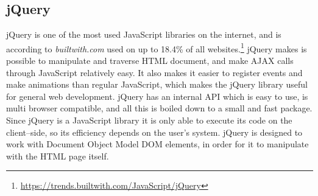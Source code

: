 \subsection{jQuery} \label{ssec:jquery}
jQuery is one of the most used JavaScript libraries on the internet, and is according to \textit{builtwith.com} used on up to 18.4\% of all websites.\footnote{\url{https://trends.builtwith.com/JavaScript/jQuery}}
jQuery makes is possible to manipulate and traverse HTML document, and make \ac{AJAX} calls through JavaScript relatively easy.
It also makes it easier to register events and make animations than regular JavaScript, which makes the jQuery library useful for general web development.
jQuery has an internal API which is easy to use, is multi browser compatible, and all this is boiled down to a small and fast package.
Since jQuery is a JavaScript library it is only able to execute its code on the client--side, so its efficiency depends on the user's system.
jQuery is designed to work with Document Object Model \ac{DOM} elements, in order for it to manipulate with the HTML page itself.
